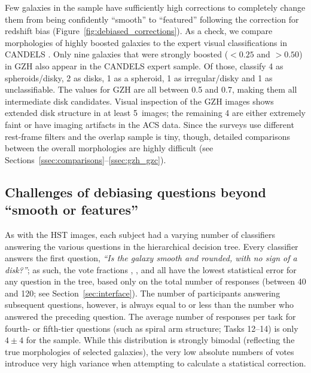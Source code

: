 \documentclass[a4paper,fleqn,usenatbib]{mnras}
\begin{document}
Few galaxies in the sample have sufficiently high corrections to completely
change them from being confidently ``smooth'' to ``featured'' following the
correction for redshift bias (Figure~\ref{fig:debiased_corrections}). As a
check, we compare morphologies of highly boosted galaxies to the expert visual
classifications in CANDELS \citep{kar15}.  Only nine galaxies that
were strongly boosted (\ffeatures$<0.25$ and \fbest$>0.50$) in GZH also
appear in the CANDELS expert sample. Of those, \citet{kar15}
classify 4 as spheroids/disky, 2 as disks, 1 as a spheroid, 1 as
irregular/disky and 1 as unclassifiable. The \fbest{} values for GZH are all
between 0.5 and 0.7, making them all intermediate disk candidates. Visual
inspection of the GZH images shows extended disk structure in at least
5~images; the remaining 4 are either extremely faint or have imaging artifacts
in the ACS data.  Since the surveys use different rest-frame filters and the
overlap sample is tiny, though, detailed comparisons between the overall
morphologies are highly difficult (see
Sections~\ref{ssec:comparisons}--\ref{ssec:gzh_gzc}).



\subsection{Challenges of debiasing questions beyond ``smooth or features''}\label{ssec:higher_order_tasks}

As with the HST images, each \ferengi{} subject had a varying number of
classifiers answering the various questions in the hierarchical decision tree.
Every classifier answers the first question, {\it ``Is the galaxy smooth and
rounded, with no sign of a disk?''}; as such, the vote fractions \fsmooth,
\ffeatures, and \fartifact{} all have the lowest statistical error for any
question in the tree, based only on the total number of responses (between
40 and 120; see Section~\ref{sec:interface}).  The number of participants
answering subsequent questions, however, is always equal to or less than the
number who answered the preceding question. The average number of responses per
task for fourth- or fifth-tier questions (such as spiral arm structure; Tasks
12--14) is only $4\pm4$ for the \ferengi{} sample. While this distribution is
strongly bimodal (reflecting the true morphologies of selected galaxies), the
very low absolute numbers of votes introduce very high variance when attempting
to calculate a statistical correction.
\end{document}
